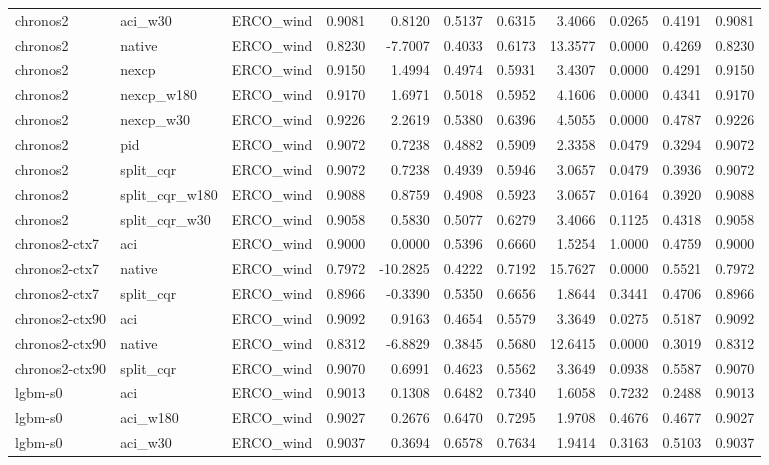 \begin{tabular}{lllrrrrrrrr}
chronos2 & aci_w30 & ERCO_wind & 0.9081 & 0.8120 & 0.5137 & 0.6315 & 3.4066 & 0.0265 & 0.4191 & 0.9081 \\
chronos2 & native & ERCO_wind & 0.8230 & -7.7007 & 0.4033 & 0.6173 & 13.3577 & 0.0000 & 0.4269 & 0.8230 \\
chronos2 & nexcp & ERCO_wind & 0.9150 & 1.4994 & 0.4974 & 0.5931 & 3.4307 & 0.0000 & 0.4291 & 0.9150 \\
chronos2 & nexcp_w180 & ERCO_wind & 0.9170 & 1.6971 & 0.5018 & 0.5952 & 4.1606 & 0.0000 & 0.4341 & 0.9170 \\
chronos2 & nexcp_w30 & ERCO_wind & 0.9226 & 2.2619 & 0.5380 & 0.6396 & 4.5055 & 0.0000 & 0.4787 & 0.9226 \\
chronos2 & pid & ERCO_wind & 0.9072 & 0.7238 & 0.4882 & 0.5909 & 2.3358 & 0.0479 & 0.3294 & 0.9072 \\
chronos2 & split_cqr & ERCO_wind & 0.9072 & 0.7238 & 0.4939 & 0.5946 & 3.0657 & 0.0479 & 0.3936 & 0.9072 \\
chronos2 & split_cqr_w180 & ERCO_wind & 0.9088 & 0.8759 & 0.4908 & 0.5923 & 3.0657 & 0.0164 & 0.3920 & 0.9088 \\
chronos2 & split_cqr_w30 & ERCO_wind & 0.9058 & 0.5830 & 0.5077 & 0.6279 & 3.4066 & 0.1125 & 0.4318 & 0.9058 \\
chronos2-ctx7 & aci & ERCO_wind & 0.9000 & 0.0000 & 0.5396 & 0.6660 & 1.5254 & 1.0000 & 0.4759 & 0.9000 \\
chronos2-ctx7 & native & ERCO_wind & 0.7972 & -10.2825 & 0.4222 & 0.7192 & 15.7627 & 0.0000 & 0.5521 & 0.7972 \\
chronos2-ctx7 & split_cqr & ERCO_wind & 0.8966 & -0.3390 & 0.5350 & 0.6656 & 1.8644 & 0.3441 & 0.4706 & 0.8966 \\
chronos2-ctx90 & aci & ERCO_wind & 0.9092 & 0.9163 & 0.4654 & 0.5579 & 3.3649 & 0.0275 & 0.5187 & 0.9092 \\
chronos2-ctx90 & native & ERCO_wind & 0.8312 & -6.8829 & 0.3845 & 0.5680 & 12.6415 & 0.0000 & 0.3019 & 0.8312 \\
chronos2-ctx90 & split_cqr & ERCO_wind & 0.9070 & 0.6991 & 0.4623 & 0.5562 & 3.3649 & 0.0938 & 0.5587 & 0.9070 \\
lgbm-s0 & aci & ERCO_wind & 0.9013 & 0.1308 & 0.6482 & 0.7340 & 1.6058 & 0.7232 & 0.2488 & 0.9013 \\
lgbm-s0 & aci_w180 & ERCO_wind & 0.9027 & 0.2676 & 0.6470 & 0.7295 & 1.9708 & 0.4676 & 0.4677 & 0.9027 \\
lgbm-s0 & aci_w30 & ERCO_wind & 0.9037 & 0.3694 & 0.6578 & 0.7634 & 1.9414 & 0.3163 & 0.5103 & 0.9037 \\

\end{tabular}
